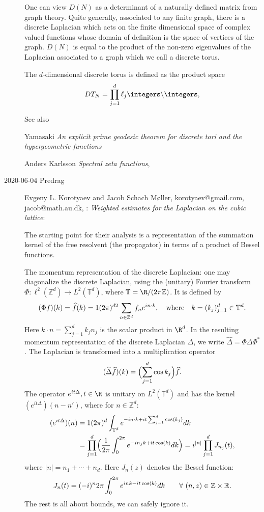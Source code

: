 \begin{description}
{One can view $D(N)$ as a determinant of a naturally defined
matrix from graph theory. Quite generally, associated to any
finite graph, there is a discrete Laplacian which acts on the finite
dimensional space of complex valued functions whose domain of
definition is the space of vertices of the graph.
$D(N)$ is equal to the product of the non-zero eigenvalues of the
Laplacian associated to a graph which we call a discrete torus.

The
$d$-dimensional discrete torus is defined as the product space
$$
DT_{N} = \prod\limits_{j=1}^{d} \ell_{j}{\integers} \backslash
{\integers},
$$

See also

Yamasaki {\em An explicit prime geodesic theorem for
discrete tori and the hypergeometric functions}

Anders Karlsson {\em Spectral zeta functions}, 
}

   \item[2020-06-04 Predrag]
Evgeny L. Korotyaev
and Jacob  Schach  M{\o}ller,
korotyaev@gmail.com, jacob@math.au.dk,
:
{\em Weighted estimates for the Laplacian on the cubic lattice}:

The starting point for their analysis is a representation of the
summation kernel of the free resolvent (the propagator) in terms of a
product of Bessel functions.

The momentum representation of the discrete Laplacian: one may
diagonalize the discrete Laplacian, using the (unitary) Fourier transform
$\Phi\colon \ell^2({\mathbb Z}^d)\to L^2({\mathbb T}^d)$, where ${\mathbb T}=\R/(2\pi {\mathbb Z})$. It is
defined by
 \[
 (\Phi f)(k)=\widehat f(k)={1\/(2\pi)^{{d\/2}}}\sum_{n\in
 {\mathbb Z}^d} f_ne^{i n\cdot k},\quad \textup{where} \quad
 k=(k_j)_{j=1}^d\in {\mathbb T}^d.
 \]
Here $k\cdot n = \sum_{j=1}^d k_j n_j$ is the scalar product in $\R^d$.
In the resulting momentum representation of the discrete Laplacian
$\Delta$, we write $\widehat \Delta =\Phi \Delta \Phi^*$. The
Laplacian is transformed into a multiplication operator
\[
(\widehat \Delta \widehat f)(k)=\Bigl(\sum_{j=1}^d \cos k_j\Bigr) \widehat f. %
\]
The operator $e^{it \Delta}, t\in \R$ is unitary  on $L^2({\mathbb T}^d)$ and has  the
kernel $(e^{it \Delta})(n-n')$, where for $n\in{\mathbb Z}^d$:
\[
\begin{aligned}
\label{DiscAsBessel}
(e^{it \Delta})(n) & ={1\/(2\pi)^{d}}\int_{{\mathbb T}^d}
e^{-i n\cdot k+it \sum_{j=1}^d \cos(k_j)}dk\\
& = \prod_{j=1}^d \Bigl(\frac1{2\pi}\int_0^{2\pi}e^{-in_jk+it\cos(k)}dk\Bigr)
= i^{|n|} \prod_{j=1}^d J_{n_j}(t),
\end{aligned}
\]
where $|n| = n_1+\cdots + n_d$.
Here $J_n(z)$ denotes the Bessel function:
\[\label{BesselFunction}
J_n(t)={(-i)^n\/2\pi}\int_0^{2\pi} e^{in k-i t\cos(k)}dk \qquad \forall \
(n,z)\in {\mathbb Z} \times {\mathbb R}.
\]
The rest is all about bounds, we can safely ignore it.



\end{description}

